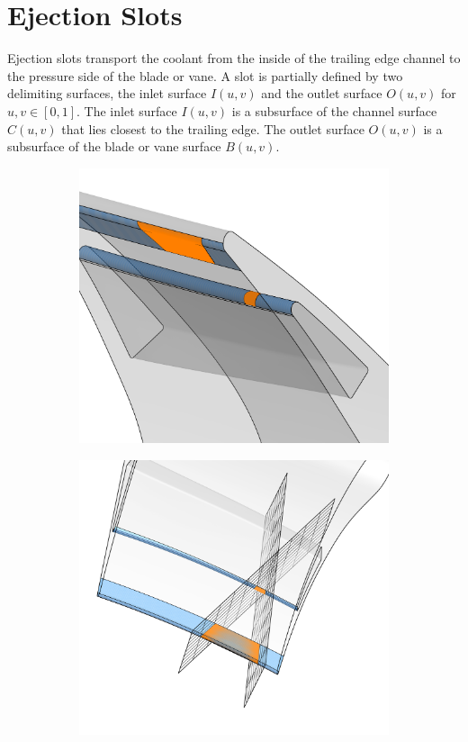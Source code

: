 \documentclass[a4paper, 11pt]{report}
\theoremstyle{definition}
\begin{document}
\section{Ejection Slots}
	Ejection slots transport the coolant from the inside of the trailing edge channel to the pressure side of the blade or vane. A slot is partially defined by two delimiting surfaces, the inlet surface $I(u,v)$ and the outlet surface $O(u,v)$ for $u,v \in [0,1]$. The inlet surface $I(u,v)$ is a subsurface of the channel surface $C(u,v)$ that lies closest to the trailing edge. The outlet surface $O(u,v)$ is a subsurface of the blade or vane surface $B(u,v)$.

	\begin{figure}[H]
		\centering
		\begin{subfigure}{.45\textwidth}
			\includegraphics[width=\textwidth]{../tec/slots/14.png}
		\end{subfigure}
		\begin{subfigure}{.45\textwidth}
			\includegraphics[width=\textwidth]{../tec/slots/15.png}

\end{subfigure}
\end{figure}
\end{document}
